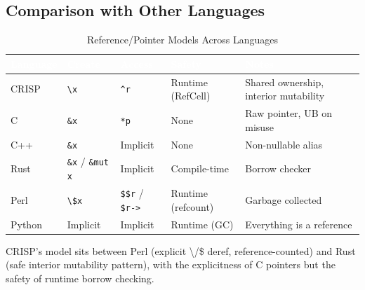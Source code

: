 \subsection{Comparison with Other Languages}

\begin{table}[H]
\centering
{}
\caption{\textcolor{darkpurple}{Reference/Pointer Models Across Languages}}
\vspace{0.3em}
\begin{tabular}{@{}llllp{5cm}@{}}
\toprule
\rowcolor{softvioletdark}
\textbf{\textcolor{white}{Language}} & \textbf{\textcolor{white}{Create}} & \textbf{\textcolor{white}{Access}} & \textbf{\textcolor{white}{Safety}} & \textbf{\textcolor{white}{Notes}} \\
\midrule
CRISP & \texttt{\textbackslash x} & \texttt{\textasciicircum r} & Runtime (RefCell) & Shared ownership, interior mutability \\
C & \texttt{\&x} & \texttt{*p} & None & Raw pointer, UB on misuse \\
C++ & \texttt{\&x} & Implicit & None & Non-nullable alias \\
Rust & \texttt{\&x} / \texttt{\&mut x} & Implicit & Compile-time & Borrow checker \\
Perl & \texttt{\textbackslash \$x} & \texttt{\$\$r} / \texttt{\$r->} & Runtime (refcount) & Garbage collected \\
Python & Implicit & Implicit & Runtime (GC) & Everything is a reference \\
\bottomrule
\end{tabular}
\end{table}

CRISP's model sits between Perl (explicit \textbackslash/\$ deref, reference-counted) and Rust (safe interior mutability pattern), with the explicitness of C pointers but the safety of runtime borrow checking.
